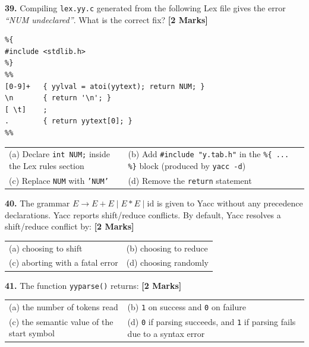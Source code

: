 \documentclass[11pt,a4paper]{article}
\begin{document}
\vspace{0.22cm}

\noindent \textbf{39.} Compiling \texttt{lex.yy.c} generated from the following Lex file gives the error \emph{``NUM undeclared''}. What is the correct fix? \hfill \textbf{[2 Marks]}
\begin{lstlisting}
%{
#include <stdlib.h>
%}
%%
[0-9]+   { yylval = atoi(yytext); return NUM; }
\n       { return '\n'; }
[ \t]    ;
.        { return yytext[0]; }
%%
\end{lstlisting}
\vspace{0.06cm}
\noindent
\begin{tabularx}{\textwidth}{@{}X X@{}}
(a) Declare \texttt{int NUM;} inside the Lex rules section & (b) Add \texttt{\#include "y.tab.h"} in the \texttt{\%\{ ... \%\}} block (produced by \texttt{yacc -d}) \\[3pt]
(c) Replace \texttt{NUM} with \texttt{'NUM'} & (d) Remove the \texttt{return} statement \\
\end{tabularx}

\vspace{0.22cm}

\noindent \textbf{40.} The grammar $E \rightarrow E+E \mid E*E \mid \text{id}$ is given to Yacc without any precedence declarations. Yacc reports shift/reduce conflicts. By default, Yacc resolves a shift/reduce conflict by: \hfill \textbf{[2 Marks]}
\vspace{0.06cm}
\noindent
\begin{tabularx}{\textwidth}{@{}X X@{}}
(a) choosing to shift & (b) choosing to reduce \\[3pt]
(c) aborting with a fatal error & (d) choosing randomly \\
\end{tabularx}

\vspace{0.22cm}

\noindent \textbf{41.} The function \texttt{yyparse()} returns: \hfill \textbf{[2 Marks]}
\vspace{0.06cm}
\noindent
\begin{tabularx}{\textwidth}{@{}X X@{}}
(a) the number of tokens read & (b) \texttt{1} on success and \texttt{0} on failure \\[3pt]
(c) the semantic value of the start symbol & (d) \texttt{0} if parsing succeeds, and \texttt{1} if parsing fails due to a syntax error \\
\end{tabularx}
\end{document}
